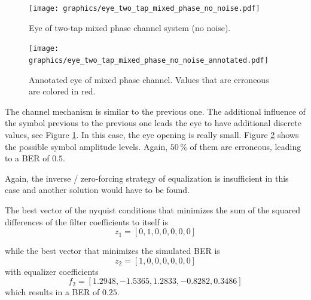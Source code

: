\documentclass[10pt, a4paper]{article}
\begin{document}
\begin{figure}%
\centering
\texttt{[image: graphics/eye\_two\_tap\_mixed\_phase\_no\_noise.pdf]}
\caption{Eye of two-tap mixed phase channel system (no noise).}\label{fig:mixed_phase_eye_no_noise}
\end{figure}

\begin{figure}%
\centering
\texttt{[image: graphics/eye\_two\_tap\_mixed\_phase\_no\_noise\_annotated.pdf]}
\caption{Annotated eye of mixed phase channel. Values that are erroneous are colored in red.}\label{fig:mixed_phase_eye_no_noise_annotated}
\end{figure}


The channel mechanism is similar to the previous one. The additional influence of the symbol previous to the previous one leads the eye to have additional discrete values, see Figure \ref{fig:mixed_phase_eye_no_noise}. In this case, the eye opening is really small. Figure \ref{fig:mixed_phase_eye_no_noise_annotated} shows the possible symbol amplitude levels. Again, $50\,\si{\percent}$ of them are erroneous, leading to a BER of $0.5$.

Again, the inverse / zero-forcing strategy of equalization is insufficient in this case and another solution would have to be found.

The best vector of the nyquist conditions that minimizes the sum of the squared differences of the filter coefficients to itself is
\[z_{1} = [ 0, 1, 0, 0, 0, 0, 0 ]\]

while the best vector that minimizes the simulated BER is
\[z_{2} = [ 1, 0, 0, 0, 0, 0, 0 ]\]
with equalizer coefficients
\[f_{2} = [ 1.2948, -1.5365, 1.2833, -0.8282, 0.3486 ]\]
which results in a BER of $0.25$.



\medskip
\printbibliography
\end{document}

